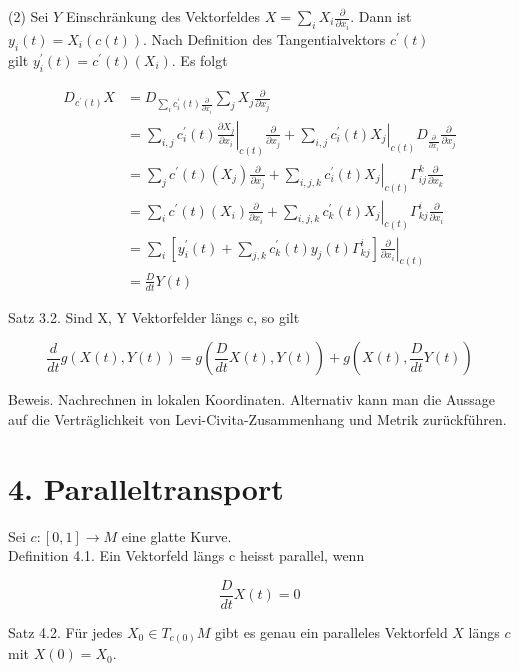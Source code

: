 \documentclass[10pt]{article}
\begin{document}
(2) Sei $Y$ Einschränkung des Vektorfeldes $X=\sum_{i} X_{i} \frac{\partial}{\partial x_{i}}$. Dann ist $y_{i}(t)=X_{i}(c(t))$. Nach Definition des Tangentialvektors $c^{\prime}(t)$\\
gilt $y_{i}^{\prime}(t)=c^{\prime}(t)\left(X_{i}\right)$. Es folgt

$$
\begin{aligned}
D_{c^{\prime}(t)} X & =D_{\sum_{i} c_{i}^{\prime}(t) \frac{\partial}{\partial x_{i}}} \sum_{j} X_{j} \frac{\partial}{\partial x_{j}} \\
& =\left.\sum_{i, j} c_{i}^{\prime}(t) \frac{\partial X_{j}}{\partial x_{i}}\right|_{c(t)} \frac{\partial}{\partial x_{j}}+\left.\sum_{i, j} c_{i}^{\prime}(t) X_{j}\right|_{c(t)} D_{\frac{\partial}{\partial x_{i}}} \frac{\partial}{\partial x_{j}} \\
& =\sum_{j} c^{\prime}(t)\left(X_{j}\right) \frac{\partial}{\partial x_{j}}+\left.\sum_{i, j, k} c_{i}^{\prime}(t) X_{j}\right|_{c(t)} \Gamma_{i j}^{k} \frac{\partial}{\partial x_{k}} \\
& =\sum_{i} c^{\prime}(t)\left(X_{i}\right) \frac{\partial}{\partial x_{i}}+\left.\sum_{i, j, k} c_{k}^{\prime}(t) X_{j}\right|_{c(t)} \Gamma_{k j}^{i} \frac{\partial}{\partial x_{i}} \\
& =\left.\sum_{i}\left[y_{i}^{\prime}(t)+\sum_{j, k} c_{k}^{\prime}(t) y_{j}(t) \Gamma_{k j}^{i}\right] \frac{\partial}{\partial x_{i}}\right|_{c(t)} \\
& =\frac{D}{d t} Y(t)
\end{aligned}
$$

Satz 3.2. Sind X, Y Vektorfelder längs c, so gilt

$$
\frac{d}{d t} g(X(t), Y(t))=g\left(\frac{D}{d t} X(t), Y(t)\right)+g\left(X(t), \frac{D}{d t} Y(t)\right)
$$

Beweis. Nachrechnen in lokalen Koordinaten. Alternativ kann man die Aussage auf die Verträglichkeit von Levi-Civita-Zusammenhang und Metrik zurückführen.

\section*{4. Paralleltransport}
Sei $c:[0,1] \rightarrow M$ eine glatte Kurve.\\
Definition 4.1. Ein Vektorfeld längs c heisst parallel, wenn

$$
\frac{D}{d t} X(t)=0
$$

Satz 4.2. Für jedes $X_{0} \in T_{c(0)} M$ gibt es genau ein paralleles Vektorfeld $X$ längs $c$ mit $X(0)=X_{0}$.
\end{document}
